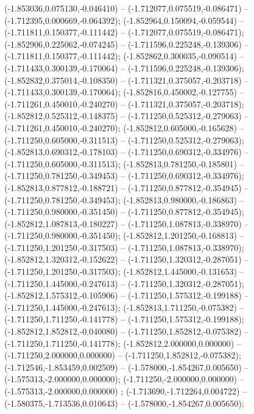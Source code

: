  (-1.853036,0.075130,-0.046410) -- (-1.712077,0.075519,-0.086471) -- (-1.712395,0.000669,-0.064392);
 (-1.852964,0.150094,-0.059544) -- (-1.711811,0.150377,-0.111442) -- (-1.712077,0.075519,-0.086471);
 (-1.852906,0.225062,-0.074245) -- (-1.711596,0.225248,-0.139306) -- (-1.711811,0.150377,-0.111442);
 (-1.852862,0.300035,-0.090514) -- (-1.711433,0.300139,-0.170064) -- (-1.711596,0.225248,-0.139306);
 (-1.852832,0.375014,-0.108350) -- (-1.711321,0.375057,-0.203718) -- (-1.711433,0.300139,-0.170064);
 (-1.852816,0.450002,-0.127755) -- (-1.711261,0.450010,-0.240270) -- (-1.711321,0.375057,-0.203718);
 (-1.852812,0.525312,-0.148375) -- (-1.711250,0.525312,-0.279063) -- (-1.711261,0.450010,-0.240270);
 (-1.852812,0.605000,-0.165628) -- (-1.711250,0.605000,-0.311513) -- (-1.711250,0.525312,-0.279063);
 (-1.852813,0.690312,-0.178103) -- (-1.711250,0.690312,-0.334976) -- (-1.711250,0.605000,-0.311513);
 (-1.852813,0.781250,-0.185801) -- (-1.711250,0.781250,-0.349453) -- (-1.711250,0.690312,-0.334976);
 (-1.852813,0.877812,-0.188721) -- (-1.711250,0.877812,-0.354945) -- (-1.711250,0.781250,-0.349453);
 (-1.852813,0.980000,-0.186863) -- (-1.711250,0.980000,-0.351450) -- (-1.711250,0.877812,-0.354945);
 (-1.852812,1.087813,-0.180227) -- (-1.711250,1.087813,-0.338970) -- (-1.711250,0.980000,-0.351450);
 (-1.852812,1.201250,-0.168813) -- (-1.711250,1.201250,-0.317503) -- (-1.711250,1.087813,-0.338970);
 (-1.852812,1.320312,-0.152622) -- (-1.711250,1.320312,-0.287051) -- (-1.711250,1.201250,-0.317503);
 (-1.852812,1.445000,-0.131653) -- (-1.711250,1.445000,-0.247613) -- (-1.711250,1.320312,-0.287051);
 (-1.852812,1.575312,-0.105906) -- (-1.711250,1.575312,-0.199188) -- (-1.711250,1.445000,-0.247613);
 (-1.852813,1.711250,-0.075382) -- (-1.711250,1.711250,-0.141778) -- (-1.711250,1.575312,-0.199188);
 (-1.852812,1.852812,-0.040080) -- (-1.711250,1.852812,-0.075382) -- (-1.711250,1.711250,-0.141778);
 (-1.852812,2.000000,0.000000) -- (-1.711250,2.000000,0.000000) -- (-1.711250,1.852812,-0.075382);
 (-1.712546,-1.853459,0.002509) -- (-1.578000,-1.854267,0.005650) -- (-1.575313,-2.000000,0.000000);
 (-1.711250,-2.000000,0.000000) -- (-1.575313,-2.000000,0.000000) ;
 (-1.713690,-1.712264,0.004722) -- (-1.580375,-1.713536,0.010643) -- (-1.578000,-1.854267,0.005650);
